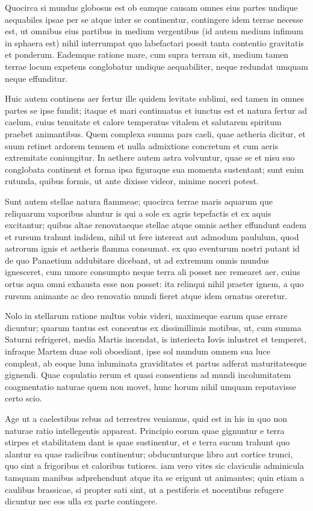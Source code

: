  Quocirca si mundus globosus est ob eamque causam omnes eius partes undique aequabiles ipsae per se atque inter se continentur, contingere idem terrae necesse est, ut omnibus eius partibus in medium vergentibus (id autem medium infimum in sphaera est) nihil interrumpat quo labefactari possit tanta contentio gravitatis et ponderum. Eademque ratione mare, cum supra terram sit, medium tamen terrae locum expetens conglobatur undique aequabiliter, neque redundat umquam neque effunditur.

 Huic autem continens aer fertur ille quidem levitate sublimi, sed tamen in omnes partes se ipse fundit; itaque et mari continuatus et iunctus est et natura fertur ad caelum, cuius tenuitate et calore temperatus vitalem et salutarem spiritum praebet animantibus. Quem complexa summa pars caeli, quae aetheria dicitur, et suum retinet ardorem tenuem et nulla admixtione concretum et cum aeris extremitate coniungitur. In aethere autem astra volvuntur, quae se et nisu suo conglobata continent et forma ipsa figuraque sua momenta sustentant; sunt enim rutunda, quibus formis, ut ante dixisse videor, minime noceri potest.

 Sunt autem stellae natura flammeae; quocirca terrae maris aquarum que reliquarum vaporibus aluntur is qui a sole ex agris tepefactis et ex aquis excitantur; quibus altae renovataeque stellae atque omnis aether effundunt eadem et rursum trahunt indidem, nihil ut fere intereat aut admodum paululum, quod astrorum ignis et aetheris flamma consumat. ex quo eventurum nostri putant id de quo Panaetium addubitare dicebant, ut ad extremum omnis mundus ignesceret, cum umore consumpto neque terra ali posset nec remearet aer, cuius ortus aqua omni exhausta esse non posset: ita relinqui nihil praeter ignem, a quo rursum animante ac deo renovatio mundi fieret atque idem ornatus oreretur.

 Nolo in stellarum ratione multus vobis videri, maximeque earum quae errare dicuntur; quarum tantus est concentus ex dissimillimis motibus, ut, cum summa Saturni refrigeret, media Martis incendat, is interiecta Iovis inlustret et temperet, infraque Martem duae soli oboediant, ipse sol mundum omnem sua luce compleat, ab eoque luna inluminata graviditates et partus adferat maturitatesque gignendi. Quae copulatio rerum et quasi consentiens ad mundi incolumitatem coagmentatio naturae quem non movet, hunc horum nihil umquam reputavisse certo scio.

 Age ut a caelestibus rebus ad terrestres veniamus, quid est in his in quo non naturae ratio intellegentis appareat. Principio eorum quae gignuntur e terra stirpes et stabilitatem dant is quae sustinentur, et e terra sucum trahunt quo alantur ea quae radicibus continentur; obducunturque libro aut cortice trunci, quo sint a frigoribus et caloribus tutiores. iam vero vites sic claviculis adminicula tamquam manibus adprehendunt atque ita se erigunt ut animantes; quin etiam a caulibus brassicae, si propter sati sint, ut a pestiferis et nocentibus refugere dicuntur nec eos ulla ex parte contingere.

